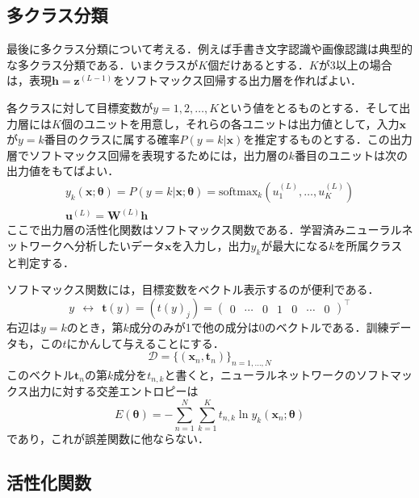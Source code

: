 \documentclass[a4paper,11pt]{jsreport}
\begin{document}
\subsection*{多クラス分類}
最後に多クラス分類について考える．例えば手書き文字認識や画像認識は典型的な多クラス分類である．いまクラスが$K$個だけあるとする．$K$が3以上の場合は，表現$\bm{h}=\bm{z}^{(L-1)}$をソフトマックス回帰する出力層を作ればよい．\par
各クラスに対して目標変数が$y=1,2,\dots,K$という値をとるものとする．そして出力層には$K$個のユニットを用意し，それらの各ユニットは出力値として，入力$\bm{x}$が$y=k$番目のクラスに属する確率$P(y=k | \bm{x})$を推定するものとする．この出力層でソフトマックス回帰を表現するためには，出力層の$k$番目のユニットは次の出力値をもてばよい．
\begin{align}
  y_k(\bm{x}; \bm{\theta}) = P(y=k | \bm{x}; \bm{\theta})
  = \text{softmax}_k \left( u_1^{(L)},\dots ,u_K^{(L)} \right) \\
  \bm{u}^{(L)} = \bm{W}^{(L)} \bm{h}
\end{align}
ここで出力層の活性化関数はソフトマックス関数である．学習済みニューラルネットワークへ分析したいデータ$\bm{x}$を入力し，出力$y_k$が最大になる$k$を所属クラスと判定する．\par
ソフトマックス関数には，目標変数をベクトル表示するのが便利である．
\begin{equation}
  y \ \ \longleftrightarrow \ \
  \bm{t}(y)
  = (t(y)_j)
  = \begin{pmatrix}
    0 & \cdots & 0 & 1 & 0 & \cdots & 0
  \end{pmatrix}^{\top}
\end{equation}
右辺は$y=k$のとき，第$k$成分のみが1で他の成分は0のベクトルである．訓練データも，この$t$にかんして与えることにする．
\begin{equation}
  \mathcal{D}
  = \{ (\bm{x}_n, \bm{t}_n) \}_{n=1,\dots,N}
\end{equation}
このベクトル$\bm{t}_n$の第$k$成分を$t_{n,k}$と書くと，ニューラルネットワークのソフトマックス出力に対する交差エントロピーは
\begin{equation}
  E(\bm{\theta}) = -\sum_{n=1}^N \sum_{k=1}^K t_{n,k} \ln{y_k}(\bm{x}_n; \bm{\theta})
\end{equation}
であり，これが誤差関数に他ならない．



\subsection{活性化関数}
\end{document}
